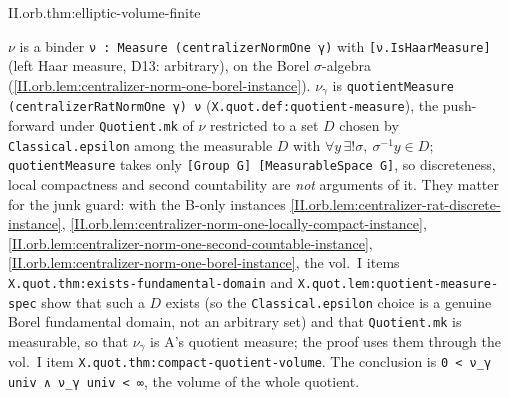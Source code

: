 \begin{theorem}
\end{theorem}
\begin{tfformal}{II.orb.thm:elliptic-volume-finite}
\begin{tffidelity}
$\nu$ is a binder \texttt{ν : Measure (centralizerNormOne γ)} with \texttt{[ν.IsHaarMeasure]} (left Haar measure, D13: arbitrary), on the Borel $\sigma$-algebra (\cref{II.orb.lem:centralizer-norm-one-borel-instance}). $\nu_\gamma$ is \texttt{quotientMeasure (centralizerRatNormOne γ) ν} (\texttt{X.quot.def:quotient-measure}), the push-forward under \texttt{Quotient.mk} of $\nu$ restricted to a set $D$ chosen by \texttt{Classical.epsilon} among the measurable $D$ with $\forall y\,\exists!\sigma,\ \sigma^{-1}y\in D$; \texttt{quotientMeasure} takes only \texttt{[Group G] [MeasurableSpace G]}, so discreteness, local compactness and second countability are \emph{not} arguments of it. They matter for the junk guard: with the B-only instances \cref{II.orb.lem:centralizer-rat-discrete-instance}, \cref{II.orb.lem:centralizer-norm-one-locally-compact-instance}, \cref{II.orb.lem:centralizer-norm-one-second-countable-instance}, \cref{II.orb.lem:centralizer-norm-one-borel-instance}, the vol.~I items \texttt{X.quot.thm:exists-fundamental-domain} and \texttt{X.quot.lem:quotient-measure-spec} show that such a $D$ exists (so the \texttt{Classical.epsilon} choice is a genuine Borel fundamental domain, not an arbitrary set) and that \texttt{Quotient.mk} is measurable, so that $\nu_\gamma$ is A's quotient measure; the proof uses them through the vol.~I item \texttt{X.quot.thm:compact-quotient-volume}. The conclusion is \texttt{0 < ν\_γ univ ∧ ν\_γ univ < ∞}, the volume of the whole quotient.
\end{tffidelity}
\end{tfformal}
